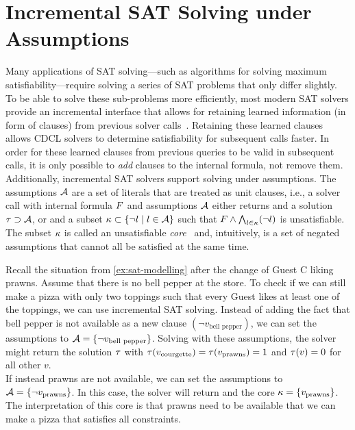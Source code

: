 \section{Incremental SAT Solving under Assumptions\label{sec:inc-sat}}

Many applications of SAT solving---such as algorithms for solving maximum satisfiability---require solving a series of SAT problems that only differ slightly.
To be able to solve these sub-problems more efficiently, most modern SAT solvers provide an incremental interface that allows for retaining learned information (in form of clauses) from previous solver calls~\autocites{DBLP:journals/entcs/EenS03,handbook2-cdcl}.
Retaining these learned clauses allows CDCL solvers to determine satisfiability for subsequent calls faster.
In order for these learned clauses from previous queries to be valid in subsequent calls, it is only possible to \emph{add} clauses to the internal formula, not remove them.
Additionally, incremental SAT solvers support solving under assumptions.
The assumptions $\mathcal{A}$ are a set of literals that are treated as unit clauses, i.e., a solver call with internal formula $F$ and assumptions $\mathcal{A}$ either returns \sat{} and a solution $\tau \supset \mathcal{A}$, or \unsat{} and a subset $\kappa \subset \{\lnot l \mid l\in\mathcal{A}\}$ such that $F \land \bigwedge_{l \in \kappa} (\lnot l)$ is unsatisfiable.
The subset $\kappa$ is called an unsatisfiable \emph{core}~\autocite{handbook2-cdcl} and, intuitively, is a set of negated assumptions that cannot all be satisfied at the same time.

\begin{example}\label{ex:inc-sat}
  Recall the situation from \cref{ex:sat-modelling} after the change of Guest C liking prawns.
  Assume that there is no bell pepper at the store.
  To check if we can still make a pizza with only two toppings such that every Guest likes at least one of the toppings, we can use incremental SAT solving.
  Instead of adding the fact that bell pepper is not available as a new clause $(\lnot v_\text{bell pepper})$, we can set the assumptions to $\mathcal{A}=\{\lnot v_\text{bell pepper}\}$.
  Solving with these assumptions, the solver might return the solution $\tau$ with $\tau(v_\text{courgette}) = \tau(v_\text{prawns}) = 1$ and $\tau(v) = 0$ for all other $v$. \\
  If instead prawns are not available, we can set the assumptions to $\mathcal{A}=\{\lnot v_\text{prawns}\}$.
  In this case, the solver will return \unsat{} and the core $\kappa=\{v_\text{prawns}\}$.
  The interpretation of this core is that prawns need to be available that we can make a pizza that satisfies all constraints.
\end{example}

